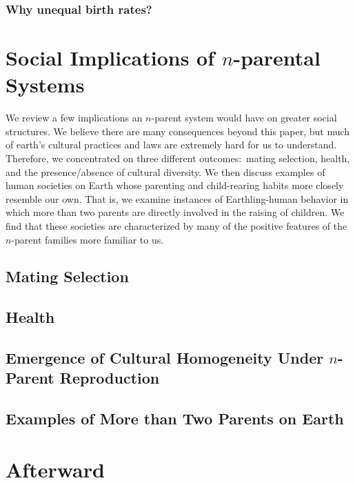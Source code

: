 \documentclass{report}
\begin{document}
\subsection{Why unequal birth rates?}




\chapter{Social Implications of $n$-parental Systems}
We review a few implications an $n$-parent system would have on greater social structures. We believe there are many consequences beyond this paper, but much of earth's cultural practices and laws are extremely hard for us to understand. Therefore, we concentrated on three different outcomes:\ mating selection, health, and the presence/absence of cultural diversity. We then discuss examples of human societies on Earth whose parenting and child-rearing habits more closely resemble our own. That is, we examine instances of Earthling-human behavior in which more than two parents are directly involved in the raising of children. We find that these societies are characterized by many of the positive features of the $n$-parent families more familiar to us.

\section{Mating Selection}


\section{Health}


\section{Emergence of Cultural Homogeneity Under $n$-Parent Reproduction}


\section{Examples of More than Two Parents on Earth}


\chapter{Afterward}



{}


\clearpage
\end{document}
